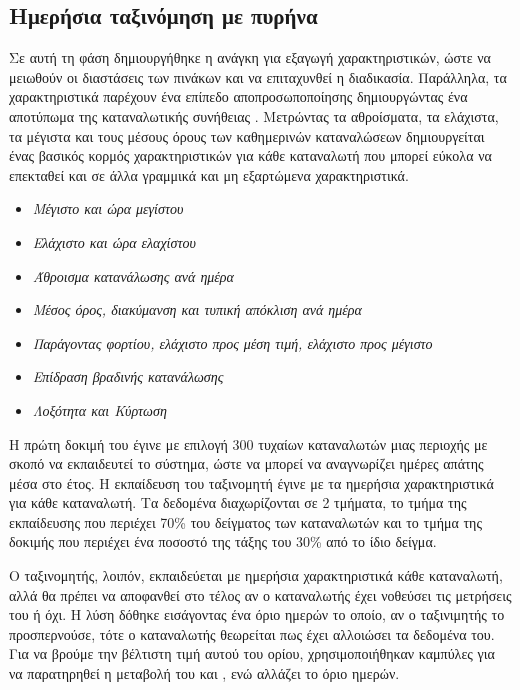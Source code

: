 \subsection{Ημερήσια ταξινόμηση με πυρήνα }
\label{sec:RBFkernel}
Σε αυτή τη φάση δημιουργήθηκε η ανάγκη για εξαγωγή χαρακτηριστικών, ώστε να μειωθούν οι διαστάσεις των πινάκων και να επιταχυνθεί η διαδικασία. Παράλληλα, τα χαρακτηριστικά παρέχουν ένα επίπεδο αποπροσωποποίησης δημιουργώντας ένα αποτύπωμα της καταναλωτικής συνήθειας \cite{giwrgis}. Μετρώντας τα αθροίσματα, τα ελάχιστα, τα μέγιστα και τους μέσους όρους των καθημερινών καταναλώσεων δημιουργείται ένας βασικός κορμός χαρακτηριστικών για κάθε καταναλωτή που μπορεί εύκολα να επεκταθεί και σε άλλα γραμμικά και μη εξαρτώμενα χαρακτηριστικά.
\begin{itemize}
\item \textit{Μέγιστο και ώρα μεγίστου}
\item \textit{Ελάχιστο και ώρα ελαχίστου}
\item \textit{Άθροισμα κατανάλωσης ανά ημέρα}
\item \textit{Μέσος όρος, διακύμανση και τυπική απόκλιση ανά ημέρα}
\item \textit{Παράγοντας φορτίου, ελάχιστο προς μέση τιμή, ελάχιστο προς μέγιστο}
\item \textit{Επίδραση βραδινής κατανάλωσης}
\item \textit{Λοξότητα και Κύρτωση}
\end{itemize}
\par Η πρώτη δοκιμή του  έγινε με επιλογή 300 τυχαίων καταναλωτών μιας περιοχής με σκοπό να εκπαιδευτεί το σύστημα, ώστε να μπορεί να αναγνωρίζει ημέρες απάτης μέσα στο έτος. Η εκπαίδευση του ταξινομητή έγινε με τα ημερήσια χαρακτηριστικά για κάθε καταναλωτή. Τα δεδομένα διαχωρίζονται σε 2 τμήματα, το τμήμα της εκπαίδευσης που περιέχει 70\% του δείγματος των καταναλωτών και το τμήμα της δοκιμής που περιέχει ένα ποσοστό της τάξης του 30\% από το ίδιο δείγμα.\par
Ο ταξινομητής, λοιπόν, εκπαιδεύεται με ημερήσια χαρακτηριστικά κάθε καταναλωτή, αλλά θα πρέπει να αποφανθεί στο τέλος αν ο καταναλωτής έχει νοθεύσει τις μετρήσεις του ή όχι. Η λύση δόθηκε εισάγοντας ένα όριο ημερών το οποίο, αν ο ταξινιμητής το προσπερνούσε, τότε ο καταναλωτής θεωρείται πως έχει αλλοιώσει τα δεδομένα του. Για να βρούμε την βέλτιστη τιμή αυτού του ορίου, χρησιμοποιήθηκαν  καμπύλες για να παρατηρηθεί η μεταβολή του  και , ενώ αλλάζει το όριο ημερών.\\
